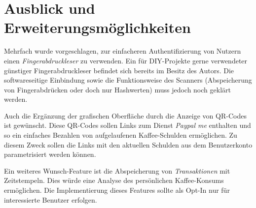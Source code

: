 \documentclass[11pt,a4paper]{IEEEtran}
\begin{document}
\section{Ausblick und Erweiterungsmöglichkeiten}

Mehrfach wurde vorgeschlagen, zur einfacheren Authentifizierung von Nutzern
einen \emph{Fingerabdruckleser} zu verwenden. Ein für DIY-Projekte gerne 
verwendeter günstiger Fingerabdruckleser befindet sich bereits im Besitz des
Autors. Die softwareseitige Einbindung sowie die Funktionsweise des Scanners
(Abspeicherung von Fingerabdrücken oder doch nur Hashwerten) muss jedoch noch
geklärt werden.

Auch die Ergänzung der grafischen Oberfläche durch die Anzeige von QR-Codes
ist gewünscht. Diese QR-Codes sollen Links zum Dienst \emph{Paypal me}
enthalten und so ein einfaches Bezahlen von aufgelaufenen Kaffee-Schulden
ermöglichen. Zu diesem Zweck sollen die Links mit den aktuellen Schulden
aus dem Benutzerkonto parametrisiert werden können.

Ein weiteres Wunsch-Feature ist die Abspeicherung von \emph{Transaktionen} mit
Zeitstempeln. Dies würde eine Analyse des persönlichen Kaffee-Konsums
ermöglichen. Die Implementierung dieses Features sollte als Opt-In nur für
interessierte Benutzer erfolgen. 

\printbibliography
\end{document}
